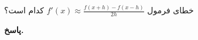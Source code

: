 خطای فرمول 
\(f'(x) \approx \frac{f(x+h) - f(x-h)}{2h}\)
کدام است؟

\begin{answer}

	\textbf{پاسخ.}
	
\end{answer}
